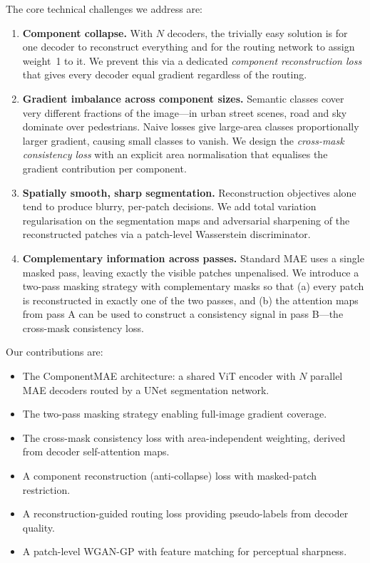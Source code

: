 \documentclass{article}
\begin{document}
The core technical challenges we address are:
\begin{enumerate}
  \item \textbf{Component collapse.}  With $N$ decoders, the trivially easy
    solution is for one decoder to reconstruct everything and for the routing
    network to assign weight~1 to it.  We prevent this via a dedicated
    \emph{component reconstruction loss} that gives every decoder equal gradient
    regardless of the routing.

  \item \textbf{Gradient imbalance across component sizes.}  Semantic classes
    cover very different fractions of the image---in urban street scenes, road
    and sky dominate over pedestrians.  Naive losses give large-area classes
    proportionally larger gradient, causing small classes to vanish.  We design
    the \emph{cross-mask consistency loss} with an explicit area normalisation
    that equalises the gradient contribution per component.

  \item \textbf{Spatially smooth, sharp segmentation.}  Reconstruction objectives
    alone tend to produce blurry, per-patch decisions.  We add total variation
    regularisation on the segmentation maps and adversarial sharpening of the
    reconstructed patches via a patch-level Wasserstein discriminator.

  \item \textbf{Complementary information across passes.}  Standard MAE uses a
    single masked pass, leaving exactly the visible patches unpenalised.  We
    introduce a two-pass masking strategy with complementary masks so that
    (a) every patch is reconstructed in exactly one of the two passes, and
    (b) the attention maps from pass A can be used to construct a consistency
    signal in pass B---the cross-mask consistency loss.
\end{enumerate}

Our contributions are:
\begin{itemize}
  \item The ComponentMAE architecture: a shared ViT encoder with $N$ parallel
    MAE decoders routed by a UNet segmentation network.
  \item The two-pass masking strategy enabling full-image gradient coverage.
  \item The cross-mask consistency loss with area-independent weighting, derived
    from decoder self-attention maps.
  \item A component reconstruction (anti-collapse) loss with masked-patch
    restriction.
  \item A reconstruction-guided routing loss providing pseudo-labels from
    decoder quality.
  \item A patch-level WGAN-GP with feature matching for perceptual sharpness.
\end{itemize}
\end{document}
